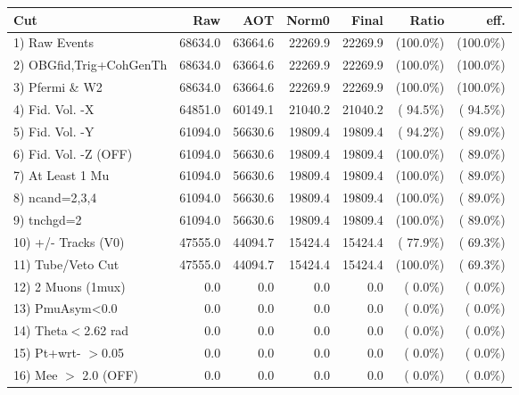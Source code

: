  \begin{table}[h!]\centering
 \begin{tabular}{||l||r|r|r|r|r|r||}
 \hline
 \hline
 Cut & Raw & AOT & Norm0 & Final & Ratio & eff.       \\
 \hline
  1) Raw Events           &      68634.0 &      63664.6 &      22269.9 &      22269.9 & (100.0\%) & (100.0\%) \\
  2) OBGfid,Trig+CohGenTh &      68634.0 &      63664.6 &      22269.9 &      22269.9 & (100.0\%) & (100.0\%) \\
  3) Pfermi \& W2         &      68634.0 &      63664.6 &      22269.9 &      22269.9 & (100.0\%) & (100.0\%) \\
  4) Fid. Vol. -X         &      64851.0 &      60149.1 &      21040.2 &      21040.2 & ( 94.5\%) & ( 94.5\%) \\
  5) Fid. Vol. -Y         &      61094.0 &      56630.6 &      19809.4 &      19809.4 & ( 94.2\%) & ( 89.0\%) \\
  6) Fid. Vol. -Z (OFF)   &      61094.0 &      56630.6 &      19809.4 &      19809.4 & (100.0\%) & ( 89.0\%) \\
  7) At Least 1 Mu        &      61094.0 &      56630.6 &      19809.4 &      19809.4 & (100.0\%) & ( 89.0\%) \\
  8) ncand=2,3,4          &      61094.0 &      56630.6 &      19809.4 &      19809.4 & (100.0\%) & ( 89.0\%) \\
  9) tnchgd=2             &      61094.0 &      56630.6 &      19809.4 &      19809.4 & (100.0\%) & ( 89.0\%) \\
 10) +/- Tracks (V0)      &      47555.0 &      44094.7 &      15424.4 &      15424.4 & ( 77.9\%) & ( 69.3\%) \\
 11) Tube/Veto Cut        &      47555.0 &      44094.7 &      15424.4 &      15424.4 & (100.0\%) & ( 69.3\%) \\
 12) 2 Muons (1mux)       &          0.0 &          0.0 &          0.0 &          0.0 & (  0.0\%) & (  0.0\%) \\
 13) PmuAsym<0.0          &          0.0 &          0.0 &          0.0 &          0.0 & (  0.0\%) & (  0.0\%) \\
 14) Theta$<$2.62 rad     &          0.0 &          0.0 &          0.0 &          0.0 & (  0.0\%) & (  0.0\%) \\
 15) Pt+wrt- $>$0.05      &          0.0 &          0.0 &          0.0 &          0.0 & (  0.0\%) & (  0.0\%) \\
 16) Mee $>$ 2.0  (OFF)   &          0.0 &          0.0 &          0.0 &          0.0 & (  0.0\%) & (  0.0\%) \\

\end{tabular}
\end{table}
